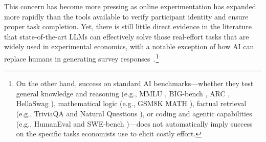 \documentclass[12pt,a4paper]{article}
\newcommand{\blue}[1]{\textcolor{blue}{#1}}
\newcommand{\SC}[1]{\textcolor{violet}{SC: #1}}
\begin{document}
This concern has become more pressing as online experimentation has expanded more rapidly than the tools available to verify participant identity and ensure proper task completion. Yet, there is still little direct evidence in the literature that state-of-the-art LLMs can effectively solve those real-effort tasks that are widely used in experimental economics, with a notable exception of how AI can replace humans in generating survey responses~\citep{celebi2026mission}.\footnote{On the other hand, success on standard AI benchmarks---whether they test general knowledge and reasoning (e.g., MMLU \citep{hendrycks2021measuring}, BIG-bench \citep{srivastava2022beyond}, ARC \citep{clark2018think}, HellaSwag \citep{zellers2019hellaswag}), mathematical logic (e.g., GSM8K \citep{cobbe2021training} MATH \citep{hendrycks2021measuringmath}), factual retrieval (e.g., TriviaQA \citep{joshi2017triviaqa} and Natural Questions \citep{kwiatkowski2019natural}), or coding and agentic capabilities (e.g., HumanEval \citep{chen2021evaluating} and SWE-bench \citep{jimenez2024swebench})---does not automatically imply success on the specific tasks economists use to elicit costly effort.}

\end{document}
